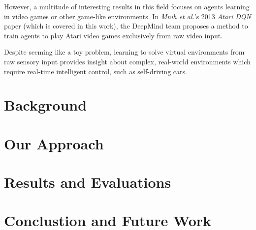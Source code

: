 \documentclass[12pt,twoside]{report}
\begin{document}
However, a multitude of interesting results in this field focuses on agents learning in video games or other game-like environments.
In \emph{Mnih et al.}'s 2013 \emph{Atari DQN} paper \cite{atari-dqn} (which is covered in this work), the DeepMind team proposes a method to train agents to play Atari video games exclusively from raw video input.

Despite seeming like a toy problem, learning to solve virtual environments from raw sensory input provides insight about complex, real-world environments which require real-time intelligent control, such as self-driving cars.

\chapter{Background}


\chapter{Our Approach}


\chapter{Results and Evaluations}


\chapter{Conclustion and Future Work}



\end{document}
